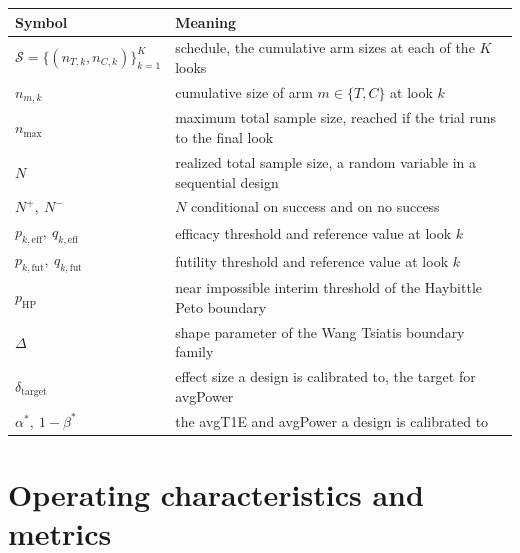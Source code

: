 \begin{tabularx}{\linewidth}{@{}lX@{}}
\toprule
Symbol & Meaning \\
\midrule
$\mathcal{S} = \{(n_{T,k}, n_{C,k})\}_{k=1}^{K}$ & schedule, the cumulative arm sizes at each of the $K$ looks \\
$n_{m,k}$                    & cumulative size of arm $m \in \{T,C\}$ at look $k$ \\
$n_{\max}$                   & maximum total sample size, reached if the trial runs to the final look \\
$N$                          & realized total sample size, a random variable in a sequential design \\
$N^+,\ N^-$                  & $N$ conditional on success and on no success \\
$p_{k,\text{eff}},\ q_{k,\text{eff}}$ & efficacy threshold and reference value at look $k$ \\
$p_{k,\text{fut}},\ q_{k,\text{fut}}$ & futility threshold and reference value at look $k$ \\
$p_{\mathrm{HP}}$            & near impossible interim threshold of the Haybittle Peto boundary \\
$\Delta$                     & shape parameter of the Wang Tsiatis boundary family \\
$\delta_{\text{target}}$     & effect size a design is calibrated to, the target for avgPower \\
$\alpha^\ast,\ 1-\beta^\ast$ & the avgT1E and avgPower a design is calibrated to \\
\bottomrule
\end{tabularx}

\section*{Operating characteristics and metrics}

